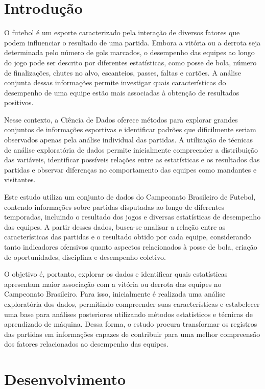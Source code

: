 \documentclass[pdflatex,sn-mathphys-num]{sn-jnl}%
\theoremstyle{thmstyleone}%
\theoremstyle{thmstyletwo}%
\theoremstyle{thmstylethree}%
\begin{document}
\section{Introdução}\label{sec1}

O futebol é um esporte caracterizado pela interação de diversos fatores que podem influenciar o resultado de uma partida. Embora a vitória ou a derrota seja determinada pelo número de gols marcados, o desempenho das equipes ao longo do jogo pode ser descrito por diferentes estatísticas, como posse de bola, número de finalizações, chutes no alvo, escanteios, passes, faltas e cartões. A análise conjunta dessas informações permite investigar quais características do desempenho de uma equipe estão mais associadas à obtenção de resultados positivos.

Nesse contexto, a Ciência de Dados oferece métodos para explorar grandes conjuntos de informações esportivas e identificar padrões que dificilmente seriam observados apenas pela análise individual das partidas. A utilização de técnicas de análise exploratória de dados permite inicialmente compreender a distribuição das variáveis, identificar possíveis relações entre as estatísticas e os resultados das partidas e observar diferenças no comportamento das equipes como mandantes e visitantes.

Este estudo utiliza um conjunto de dados do Campeonato Brasileiro de Futebol, contendo informações sobre partidas disputadas ao longo de diferentes temporadas, incluindo o resultado dos jogos e diversas estatísticas de desempenho das equipes. A partir desses dados, busca-se analisar a relação entre as características das partidas e o resultado obtido por cada equipe, considerando tanto indicadores ofensivos quanto aspectos relacionados à posse de bola, criação de oportunidades, disciplina e desempenho coletivo.

O objetivo é, portanto, explorar os dados e identificar quais estatísticas apresentam maior associação com a vitória ou derrota das equipes no Campeonato Brasileiro. Para isso, inicialmente é realizada uma análise exploratória dos dados, permitindo compreender suas características e estabelecer uma base para análises posteriores utilizando métodos estatísticos e técnicas de aprendizado de máquina. Dessa forma, o estudo procura transformar os registros das partidas em informações capazes de contribuir para uma melhor compreensão dos fatores relacionados ao desempenho das equipes.

\section{Desenvolvimento}
\end{document}
